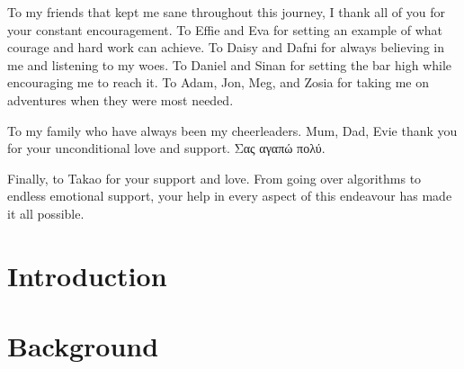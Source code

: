 \documentclass[]{phdthesis}
\begin{document}
\begin{acknowledgements}
To my friends that kept me sane throughout this journey, I thank all of you for your constant encouragement. To Effie and Eva for setting an example of what courage and hard work can achieve. To Daisy and Dafni for always believing in me and listening to my woes. To Daniel and Sinan for setting the bar high while encouraging me to reach it. To Adam, Jon, Meg, and Zosia for taking me on adventures when they were most needed. 

To my family who have always been my cheerleaders. Mum, Dad, Evie thank you for your unconditional love and support. Σας αγαπώ πολύ. 

Finally, to Takao for your support and love. From going over algorithms to endless emotional support, your help in every aspect of this endeavour has made it all possible. 

\end{acknowledgements}
\tableofcontents*
\listoffigures
\listoftables
{}

\printglossary[type=\acronymtype, title=Abbreviations, toctitle=List of Abbreviations]





\mainmatter*
\chapter{Introduction}
\label{ch:Intro}


\mainmatter*
\chapter{Background}
\label{ch:backg}



%
\end{document}
